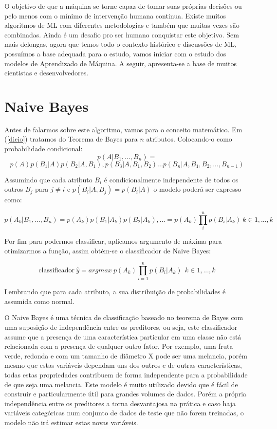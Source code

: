 \documentclass[
  openany]{book}
\begin{document}
O objetivo de que a máquina se torne capaz de tomar suas próprias decisões ou pelo menos com o mínimo de intervenção humana continua. Existe muitos algoritmos de ML com diferentes metodologias e também que muitas vezes são combinadas. Ainda é um desafio pro ser humano conquistar este objetivo. Sem mais delongas, agora que temos todo o contexto histórico e discussões de ML, possuímos a base adequada para o estudo, vamos iniciar com o estudo dos modelos de Aprendizado de Máquina. A seguir, apresenta-se a base de muitos cientistas e desenvolvedores.

\hypertarget{naive-bayes}{%
\section{Naive Bayes}\label{naive-bayes}}

Antes de falarmos sobre este algoritmo, vamos para o conceito matemático. Em (\ref{dicio}) tratamos do Teorema de Bayes para \(n\) atributos. Colocando-o como probabilidade condicional:
\[p(A|B_{1},...,B_{n}) = \]
\begin{equation} 
  p(A)p(B_{1}|A)p(B_{2}|A,B_{1}),p(B_{3}|A,B_{1},B_{2})...p(B_{n}|A,B_{1},B_{2},...,B_{n−1})
  \label{eq:bayescond}
\end{equation}

Assumindo que cada atributo \(B_i\) é condicionalmente independente de todos os outros \(B_j\) para \(j\neq i\) e \(p(B_i|A,B_j)=p(B_i|A)\) o modelo poderá ser expresso como:

\begin{equation} 
  p(A_k|B_1,...,B_n)=p(A_k)p(B_1|A_k)p(B_2|A_k),...=p(A_k)\prod_i^n p(B_i|A_k) \ k ∈{1,...,k}
  \label{eq:bayesprodutorio}
\end{equation}

Por fim para podermos classificar, aplicamos argumento de máxima para otimizarmos a função, assim obtém-se o classificador de Naive Bayes:

\begin{equation} 
  \mbox{classificador} \ \hat{y}=argmax \ p(A_k)\displaystyle \prod_{i=1}^n p(B_i|A_k) \ \ k ∈{1,...,k}
  \label{eq:naivebayes}
\end{equation}

Lembrando que para cada atributo, a sua distribuição de probabilidades é assumida como normal.

O Naive Bayes é uma técnica de classificação baseado no teorema de Bayes com uma suposição de independência entre os preditores, ou seja, este classificador assume que a presença de uma característica particular em uma classe não está relacionada com a presença de qualquer outro fator. Por exemplo, uma fruta verde, redonda e com um tamanho de diâmetro X pode ser uma melancia, porém mesmo que estas variáveis dependam uns dos outros e de outras características, todas estas propriedades contribuem de forma independente para a probabilidade de que seja uma melancia. Este modelo é muito utilizado devido que é fácil de construir e particularmente útil para grandes volumes de dados. Porém a própria independência entre os preditores a torna desvantajosa na prática e caso haja variáveis categóricas num conjunto de dados de teste que não forem treinadas, o modelo não irá estimar estas novas variáveis.
\end{document}
